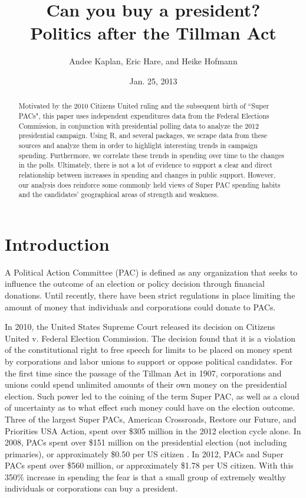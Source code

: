 \documentclass[11pt]{article}\usepackage{graphicx, color}
\begin{document}
\setlength{\parskip}{3ex}
\setlength{\parindent}{0pt}

\title{Can you buy a president? \\ \vspace{.6cm} \Large Politics after the Tillman Act}
\author{Andee Kaplan, Eric Hare, and Heike Hofmann}
\date{Jan. 25, 2013}

\maketitle
\thispagestyle{empty}
\begin{abstract}
Motivated by the 2010 Citizens United ruling and the subsequent birth of ``Super PACs", this paper uses independent expenditures data from the Federal Elections Commission, in conjunction with presidential polling data to analyze the 2012 presidential campaign. Using R, and several packages, we scrape data from these sources and analyze them in order to highlight interesting trends in campaign spending. Furthermore, we correlate these trends in spending over time to the changes in the polls. Ultimately, there is not a lot of evidence to support a clear and direct relationship between increases in spending and changes in public support. However, our analysis does reinforce some commonly held views of Super PAC spending habits and the candidates' geographical areas of strength and weakness.
\end{abstract}
\clearpage

\setcounter{page}{1}
\section{Introduction}

A Political Action Committee (PAC) is defined as any organization that seeks to influence the outcome of an election or policy decision through financial donations. Until recently, there have been strict regulations in place limiting the amount of money that individuals and corporations could donate to PACs.

In 2010, the United States Supreme Court released its decision on Citizens United v. Federal Election Commission. The decision found that it is a violation of the constitutional right to free speech for limits to be placed on money spent by corporations and labor unions to support or oppose political candidates. For the first time since the passage of the Tillman Act in 1907, corporations and unions could spend unlimited amounts of their own money on the presidential election. Such power led to the coining of the term Super PAC, as well as a cloud of uncertainty as to what effect such money could have on the election outcome. Three of the largest Super PACs, American Crossroads, Restore our Future, and Priorities USA Action, spent over \$305 million in the 2012 election cycle alone. In 2008, PACs spent over \$151 million on the presidential election (not including primaries), or approximately \$0.50 per US citizen \cite{fc-spend}. In 2012, PACs and Super PACs spent over \$560 million, or approximately \$1.78 per US citizen. With this 350\% increase in spending the fear is that a small group of extremely wealthy individuals or corporations can buy a president.
\end{document}
